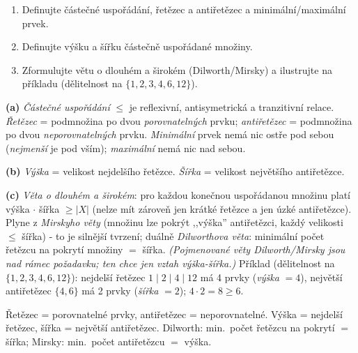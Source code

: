 \begin{zadani}
\begin{enumerate}[label=(\alph*)]
  \item {} Definujte částečné uspořádání, řetězec a antiřetězec a minimální/maximální prvek.
  \item {} Definujte výšku a šířku částečně uspořádané množiny.
  \item {} Zformulujte větu o dlouhém a širokém (Dilworth/Mirsky) a ilustrujte na příkladu (dělitelnost na $\{1,2,3,4,6,12\}$).
\end{enumerate}
\end{zadani}

\begin{reseni}
\textbf{(a)} \emph{Částečné uspořádání} $\le$ je reflexivní, antisymetrická a tranzitivní relace. \emph{Řetězec} = podmnožina po dvou \emph{porovnatelných} prvku; \emph{antiřetězec} = podmnožina po dvou \emph{neporovnatelných} prvku. \emph{Minimální} prvek nemá nic ostře pod sebou (\emph{nejmenší} je pod vším); \emph{maximální} nemá nic nad sebou.

\textbf{(b)} \emph{Výška} = velikost nejdelšího řetězce. \emph{Šířka} = velikost největšího antiřetězce.

\textbf{(c)} \emph{Věta o dlouhém a širokém}: pro každou konečnou uspořádanou množinu platí výška$\,\cdot\,$šířka $\ge|X|$ (nelze mít zároveň jen krátké řetězce a jen úzké antiřetězce). Plyne z \emph{Mirskyho věty} (množinu lze pokrýt ,,výška'' antiřetězci, každý velikosti $\le$ šířka) - to je silnější tvrzení; duálně \emph{Dilworthova věta}: minimální počet řetězcu na pokrytí množiny $=$ šířka. \emph{(Pojmenované věty Dilworth/Mirsky jsou nad rámec požadavku; ten chce jen vztah výška-šířka.)} Příklad (dělitelnost na $\{1,2,3,4,6,12\}$): nejdelší řetězec $1\mid2\mid4\mid12$ má 4 prvky (\emph{výška} $=4$), největší antiřetězec $\{4,6\}$ má 2 prvky (\emph{šířka} $=2$); $4\cdot2=8\ge6$.
\end{reseni}

\begin{jadro}
Řetězec = porovnatelné prvky, antiřetězec = neporovnatelné. Výška = nejdelší řetězec, šířka = největší antiřetězec. Dilworth: min.\ počet řetězcu na pokrytí $=$ šířka; Mirsky: min.\ počet antiřetězcu $=$ výška.
\end{jadro}

